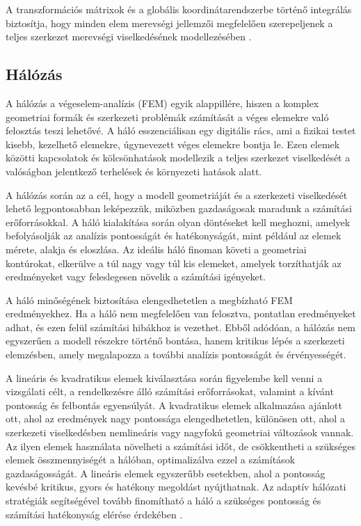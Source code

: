 \documentclass[12pt,a4paper,oneside]{report}
\begin{document}
A transzformációs mátrixok és a globális koordinátarendszerbe történő integrálás biztosítja, hogy minden elem merevségi jellemzői megfelelően szerepeljenek a teljes szerkezet merevségi viselkedésének modellezésében \citep{voros2012veges,paczelt2007veges,VEM2011}.

\subsection{Hálózás}
A hálózás a végeselem-analízis (FEM) egyik alappillére, hiszen a komplex geometriai formák és szerkezeti problémák számítását a véges elemekre való felosztás teszi lehetővé. A háló esszenciálisan egy digitális rács, ami a fizikai testet kisebb, kezelhető elemekre, úgynevezett véges elemekre bontja le. Ezen elemek közötti kapcsolatok és kölcsönhatások modellezik a teljes szerkezet viselkedését a valóságban jelentkező terhelések és környezeti hatások alatt.

A hálózás során az a cél, hogy a modell geometriáját és a szerkezeti viselkedését lehető legpontosabban leképezzük, miközben gazdaságosak maradunk a számítási erőforrásokkal. A háló kialakítása során olyan döntéseket kell meghozni, amelyek befolyásolják az analízis pontosságát és hatékonyságát, mint például az elemek mérete, alakja és eloszlása. Az ideális háló finoman követi a geometriai kontúrokat, elkerülve a túl nagy vagy túl kis elemeket, amelyek torzíthatják az eredményeket vagy feleslegesen növelik a számítási igényeket.

A háló minőségének biztosítása elengedhetetlen a megbízható FEM eredményekhez. Ha a háló nem megfelelően van felosztva, pontatlan eredményeket adhat, és ezen felül számítási hibákhoz is vezethet. Ebből adódóan, a hálózás nem egyszerűen a modell részekre történő bontása, hanem kritikus lépés a szerkezeti elemzésben, amely megalapozza a további analízis pontosságát és érvényességét.

A lineáris és kvadratikus elemek kiválasztása során figyelembe kell venni a vizsgálati célt, a rendelkezésre álló számítási erőforrásokat, valamint a kívánt pontosság és felbontás egyensúlyát. A kvadratikus elemek alkalmazása ajánlott ott, ahol az eredmények nagy pontossága elengedhetetlen, különösen ott, ahol a szerkezeti viselkedésben nemlineáris vagy nagyfokú geometriai változások vannak. Az ilyen elemek használata növelheti a számítási időt, de csökkentheti a szükséges elemek összmennyiségét a hálóban, optimalizálva ezzel a számítások gazdaságosságát. A lineáris elemek egyszerűbb esetekben, ahol a pontosság kevésbé kritikus, gyors és hatékony megoldást nyújthatnak. Az adaptív hálózati stratégiák segítségével tovább finomítható a háló a szükséges pontosság és számítási hatékonyság elérése érdekében \cite{tamas2014vegeselem}.
\end{document}
